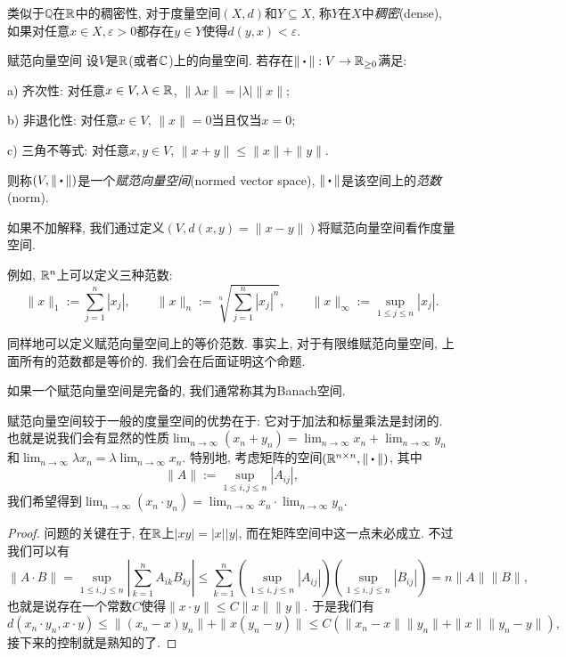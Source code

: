 类似于$\mathbb{Q}$在$\mathbb{R}$中的稠密性, 对于度量空间$(X,d)$和$Y \subseteq X$, 称$Y$在$X$中\textit{稠密}(dense), 如果对任意$x \in X, \varepsilon >0$都存在$y \in Y$使得$d(y,x) < \varepsilon$. 

\begin{axiom}{赋范向量空间}
	设$V$是$\mathbb{R}$(或者$\mathbb{C}$)上的向量空间. 若存在$\| \bigcdot \|:V \to \R _{\geq 0}$满足: 
	
	a) 齐次性: 对任意$x \in V, \lambda \in \mathbb{R}$, $\| \lambda x \|=|\lambda | \| x \|$; 
	
	b) 非退化性: 对任意$x \in V$, $\| x \|=0$当且仅当$x=0$; 
	
	c) 三角不等式: 对任意$x,y \in V$, $\| x+y \| \leq \| x \|+\| y \|$. 
	
	\noindent
	则称$(V,\| \bigcdot \| )$是一个\textit{赋范向量空间}(normed vector space), $\| \bigcdot \|$是该空间上的\textit{范数}(norm). 
\end{axiom}
\begin{remark}
	如果不加解释, 我们通过定义$(V,d(x,y)=\| x-y \|)$将赋范向量空间看作度量空间. 
\end{remark}

例如, $\mathbb{R} ^n$上可以定义三种范数: $$\| x \|_1 := \sum_{j=1}^n |x_j|,\qquad \| x \|_n := \sqrt[n]{\sum_{j=1}^n |x_j|^n},\qquad \| x \|_{\infty} := \sup_{1 \leq j \leq n}|x_j|. $$

同样地可以定义赋范向量空间上的等价范数. 事实上, 对于有限维赋范向量空间, 上面所有的范数都是等价的. 我们会在后面证明这个命题. 

如果一个赋范向量空间是完备的, 我们通常称其为Banach空间. 

赋范向量空间较于一般的度量空间的优势在于: 它对于加法和标量乘法是封闭的. 也就是说我们会有显然的性质$\lim_{n\to \infty} (x_n+y_n) = \lim_{n\to \infty} x_n + \lim_{n\to \infty} y_n$和$\lim_{n\to \infty} \lambda x_n = \lambda \lim_{n\to \infty} x_n$. 特别地, 考虑矩阵的空间$(\R ^{n\times n},\| \bigcdot \|)$, 其中$$\| A \| := \sup_{1 \leq i,j \leq n} |A_{ij}|,$$
我们希望得到$\lim_{n\to \infty} (x_n \cdot y_n) = \lim_{n\to \infty} x_n \cdot \lim_{n\to \infty} y_n$. 
\begin{proof}
	问题的关键在于, 在$\mathbb{R}$上$|xy|=|x||y|$, 而在矩阵空间中这一点未必成立. 不过我们可以有$$\| A \cdot B \| = \sup_{1 \leq i,j \leq n} |\sum_{k=1}^{n}A_{ik}B_{kj}| \leq \sum_{k=1}^n (\sup_{1 \leq i,j \leq n} |A_{ij}|)(\sup_{1 \leq i,j \leq n} |B_{ij}|) = n\| A \| \| B \|,$$
	也就是说存在一个常数$C$使得$\| x\cdot y \| \leq C\| x \| \| y \|$. 于是我们有$$d(x_n \cdot y_n,x \cdot y) \leq \| (x_n-x)y_n \| 
		+ \| x(y_n-y) \| \leq C(\| x_n-x \| \| y_n \| 
		+ \| x \| \| y_n-y \|),$$
	接下来的控制就是熟知的了. 
\end{proof}

